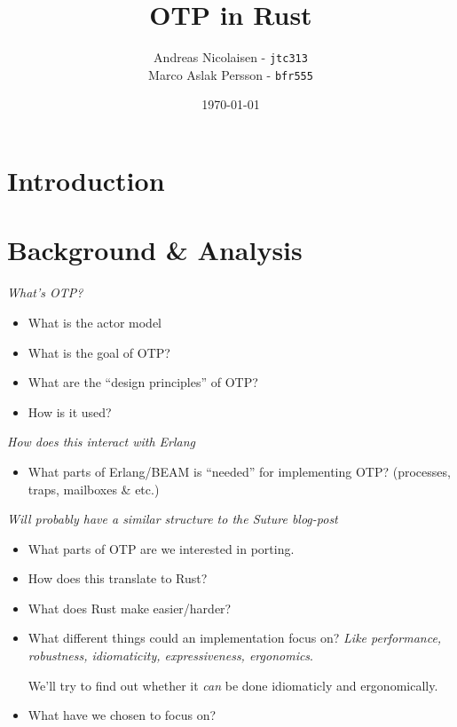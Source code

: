 \documentclass[a4paper]{article}
\title{OTP in Rust}
\author{Andreas Nicolaisen - \texttt{jtc313} \\ Marco Aslak Persson - \texttt{bfr555}}
\date{\today}
\begin{document}

\maketitle

\section{Introduction}

\section{Background \& Analysis}
\textit{What's OTP?}
\begin{itemize}
\item What is the actor model
\item What is the goal of OTP?
\item What are the ``design principles'' of OTP?
\item How is it used?
\end{itemize}

\textit{How does this interact with Erlang}
\begin{itemize}
\item What parts of Erlang/BEAM is ``needed'' for implementing OTP? (processes,
  traps, mailboxes \& etc.)
\end{itemize}

\textit{Will probably have a similar structure to the Suture blog-post}
\begin{itemize}
\item What parts of OTP are we interested in porting.
\item How does this translate to Rust?
\item What does Rust make easier/harder?
\item What different things could an implementation focus on?
  \textit{Like performance, robustness, idiomaticity, expressiveness, ergonomics}.

  We'll try to find out whether it \textit{can} be done idiomaticly and ergonomically.

\item What have we chosen to focus on?
\end{itemize}
\end{document}
